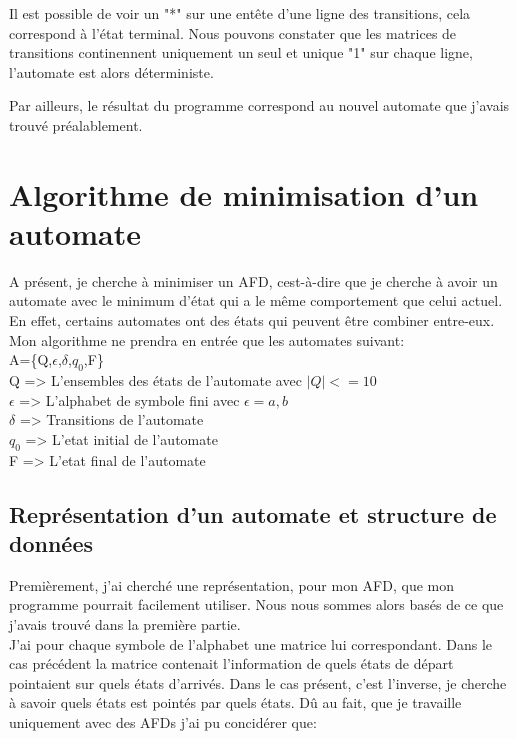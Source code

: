 \documentclass[a4paper]{article}
\begin{document}
Il est possible de voir un "*" sur une entête d'une ligne des transitions, cela correspond
à l'état terminal. Nous pouvons constater que les matrices de transitions continennent uniquement
un seul et unique "1" sur chaque ligne, l'automate est alors déterministe.

Par ailleurs, le résultat du programme correspond au nouvel automate que j'avais trouvé préalablement.

\newpage

\section{Algorithme de minimisation d'un automate}

A présent, je cherche à minimiser un AFD, cest-à-dire que je
cherche à avoir un automate avec le minimum d'état qui a le même
comportement que celui actuel. En effet, certains automates ont
des états qui peuvent être combiner entre-eux. Mon algorithme ne 
prendra en entrée que les automates suivant: \\

A=\{Q,$\epsilon$,$\delta$,$q_0$,F\}\\
Q => L'ensembles des états de l'automate avec $|Q|<=10$\\
$\epsilon$ => L'alphabet de symbole fini avec $\epsilon={a,b}$\\
$\delta$ => Transitions de l'automate\\
$q_0$ => L'etat initial de l'automate\\
F => L'etat final de l'automate\\



\subsection{Représentation d'un automate et structure de données}

Premièrement, j'ai cherché une représentation, pour mon
AFD, que mon programme pourrait facilement utiliser. Nous 
nous sommes alors basés de ce que j'avais trouvé dans la 
première partie.\\
J'ai pour chaque symbole de l'alphabet une matrice lui correspondant. Dans
le cas précédent la matrice contenait l'information de quels états
de départ pointaient sur quels états d'arrivés. Dans le cas présent,
c'est l'inverse, je cherche à savoir quels états est pointés par
quels états. Dû au fait, que je travaille uniquement avec des AFDs
j'ai pu concidérer que:\\
\end{document}
